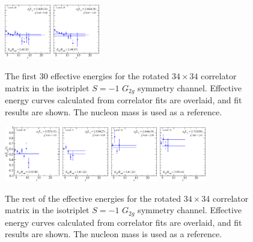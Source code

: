 \begin{figure}[H]
    \includegraphics[width=0.18\textwidth]{figures/sigmas/g2g/fits/fit_10.pdf}
    \includegraphics[width=0.18\textwidth]{figures/sigmas/g2g/fits/fit_16.pdf}
    \caption{The first 30 effective energies for the rotated $34\times 34$ correlator matrix in the isotriplet $S=-1$ $G_{2g}$ symmetry channel. Effective energy curves calculated from correlator fits are overlaid, and fit results are shown. The nucleon mass is used as a reference.}\label{fig:g2g_fits1}
\end{figure}

\begin{figure}[H]
    \centering
    \includegraphics[width=0.215\textwidth]{figures/sigmas/g2g/fits/fit_25.pdf}
    \includegraphics[width=0.18\textwidth]{figures/sigmas/g2g/fits/fit_29.pdf}
    \includegraphics[width=0.18\textwidth]{figures/sigmas/g2g/fits/fit_33.pdf}
    \includegraphics[width=0.18\textwidth]{figures/sigmas/g2g/fits/fit_32.pdf}
    \caption{The rest of the effective energies for the rotated $34\times 34$ correlator matrix in the isotriplet $S=-1$ $G_{2g}$ symmetry channel. Effective energy curves calculated from correlator fits are overlaid, and fit results are shown. The nucleon mass is used as a reference.}\label{fig:g2g_fits2}
\end{figure}

